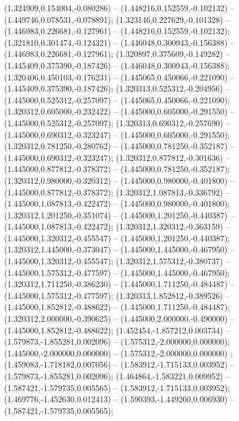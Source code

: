  (1.324909,0.154004,-0.080286) -- (1.448216,0.152559,-0.102132) -- (1.449746,0.078531,-0.078891);
 (1.323146,0.227629,-0.101328) -- (1.446983,0.226681,-0.127961) -- (1.448216,0.152559,-0.102132);
 (1.321810,0.301474,-0.124321) -- (1.446048,0.300943,-0.156388) -- (1.446983,0.226681,-0.127961);
 (1.320897,0.375609,-0.149282) -- (1.445409,0.375390,-0.187426) -- (1.446048,0.300943,-0.156388);
 (1.320406,0.450103,-0.176231) -- (1.445065,0.450066,-0.221090) -- (1.445409,0.375390,-0.187426);
 (1.320313,0.525312,-0.204956) -- (1.445000,0.525312,-0.257097) -- (1.445065,0.450066,-0.221090);
 (1.320312,0.605000,-0.232422) -- (1.445000,0.605000,-0.291550) -- (1.445000,0.525312,-0.257097);
 (1.320313,0.690312,-0.257690) -- (1.445000,0.690312,-0.323247) -- (1.445000,0.605000,-0.291550);
 (1.320312,0.781250,-0.280762) -- (1.445000,0.781250,-0.352187) -- (1.445000,0.690312,-0.323247);
 (1.320312,0.877812,-0.301636) -- (1.445000,0.877812,-0.378372) -- (1.445000,0.781250,-0.352187);
 (1.320312,0.980000,-0.320312) -- (1.445000,0.980000,-0.401800) -- (1.445000,0.877812,-0.378372);
 (1.320312,1.087813,-0.336792) -- (1.445000,1.087813,-0.422472) -- (1.445000,0.980000,-0.401800);
 (1.320312,1.201250,-0.351074) -- (1.445000,1.201250,-0.440387) -- (1.445000,1.087813,-0.422472);
 (1.320312,1.320312,-0.363159) -- (1.445000,1.320312,-0.455547) -- (1.445000,1.201250,-0.440387);
 (1.320312,1.445000,-0.373047) -- (1.445000,1.445000,-0.467950) -- (1.445000,1.320312,-0.455547);
 (1.320312,1.575312,-0.380737) -- (1.445000,1.575312,-0.477597) -- (1.445000,1.445000,-0.467950);
 (1.320312,1.711250,-0.386230) -- (1.445000,1.711250,-0.484487) -- (1.445000,1.575312,-0.477597);
 (1.320313,1.852812,-0.389526) -- (1.445000,1.852812,-0.488622) -- (1.445000,1.711250,-0.484487);
 (1.320312,2.000000,-0.390625) -- (1.445000,2.000000,-0.490000) -- (1.445000,1.852812,-0.488622);
 (1.452454,-1.857212,0.003734) -- (1.579873,-1.855281,0.002096) -- (1.575312,-2.000000,0.000000);
 (1.445000,-2.000000,0.000000) -- (1.575312,-2.000000,0.000000) ;
 (1.459083,-1.718182,0.007056) -- (1.583912,-1.715133,0.003952) -- (1.579873,-1.855281,0.002096);
 (1.464864,-1.583221,0.009952) -- (1.587421,-1.579735,0.005565) -- (1.583912,-1.715133,0.003952);
 (1.469776,-1.452630,0.012413) -- (1.590393,-1.449260,0.006930) -- (1.587421,-1.579735,0.005565);
